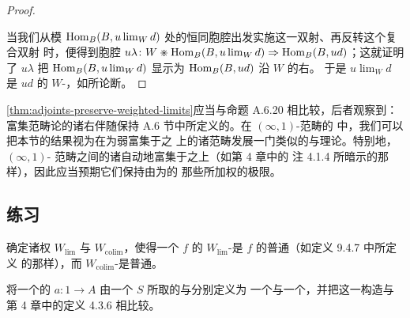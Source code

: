 \begin{proof}
\begin{center}
\end{center}
当我们从模 $\mathrm{Hom}_{B}(B,u\lim_{W}d)$ 处的恒同胞腔出发实施这一双射、再反转这个复合双射
时，便得到胞腔
$u\lambda\colon W\divideontimes\mathrm{Hom}_{B}(B,u\lim_{W}d)\Rightarrow\mathrm{Hom}_{B}(B,ud)$；这就证明了
$u\lambda$ 把 $\mathrm{Hom}_{B}(B,u\lim_{W}d)$ 显示为 $\mathrm{Hom}_{B}(B,ud)$ 沿 $W$ 的右\trExtension{}。
于是 $u\lim_{W}d$ 是 $ud$ 的 $W$-\trWeightedLimit{}，如所论断。
\end{proof}

\cref{thm:adjoints-preserve-weighted-limits}应当与命题 A.6.20 相比较，后者观察到：
富集范畴论的诸右伴随保持 A.6 节中所定义的\trWeightedLimit{}。在 $(\infty,1)$-范畴的%
\trInfinityCosmos{}中，我们可以把本节的结果视为在为弱富集于\trInfinityGroupoid{}之
上的诸范畴发展一门类似的\trWeightedLimit{}与\trWeightedColimit{}理论。特别地，$(\infty,1)$-
范畴之间的诸\trAdjunction{}自动地富集于\trInfinityGroupoid{}之上（如第 4 章中的
注 4.1.4 所暗示的那样），因此应当预期它们保持由\trFiber{}为\trInfinityGroupoid{}的
那些\trModule{}所加权的极限。

\subsection*{练习}

\begin{exercise}\label{ex:ordinary-limits-as-weighted}
确定诸权 $W_{\mathrm{lim}}$ 与 $W_{\mathrm{colim}}$，使得一个\trDiagram{} $f$ 的
$W_{\mathrm{lim}}$-\trWeightedLimit{}是 $f$ 的普通\trLimit{}（如定义 9.4.7 中所定义
的那样），而 $W_{\mathrm{colim}}$-\trWeightedColimit{}是普通\trColimit{}。
\end{exercise}

\begin{exercise}\label{ex:tensor-cotensor-as-weighted}
将一个\trInfinityCategory{}的\trElement{} $a\colon 1\to A$ 由一个\trDiscrete{}%
\trInfinityCategory{} $S$ 所取的\textbf{\trTensor}与\textbf{\trCotensor}分别定义为
一个\trWeightedColimit{}与一个\trWeightedLimit{}，并把这一构造与第 4 章中的定义 4.3.6 相比较。
\end{exercise}


